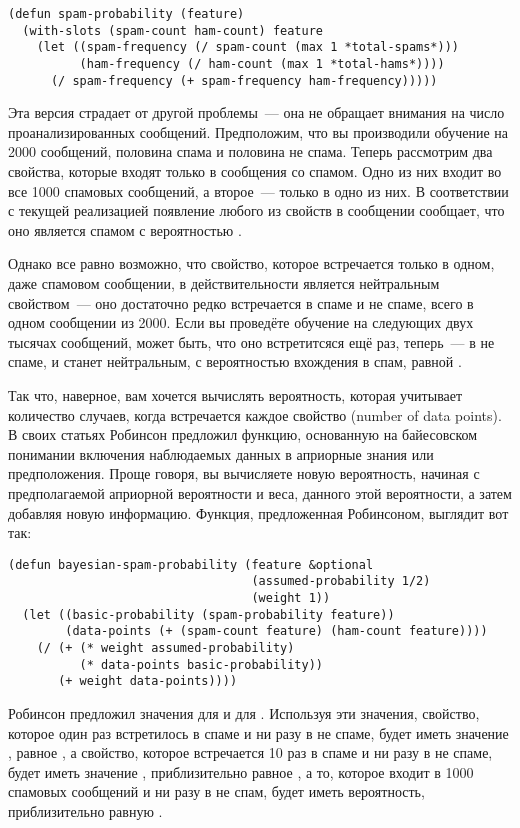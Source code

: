 \begin{lstlisting}
(defun spam-probability (feature)
  (with-slots (spam-count ham-count) feature
    (let ((spam-frequency (/ spam-count (max 1 *total-spams*)))
          (ham-frequency (/ ham-count (max 1 *total-hams*))))
      (/ spam-frequency (+ spam-frequency ham-frequency)))))
\end{lstlisting}

Эта версия страдает от другой проблемы~--- она не обращает внимания на число
проанализированных сообщений.  Предположим, что вы производили обучение на 2000 сообщений,
половина спама и половина не спама.  Теперь рассмотрим два свойства, которые входят только
в сообщения со спамом.  Одно из них входит во все 1000 спамовых сообщений, а второе~---
только в одно из них.  В соответствии с текущей реализацией 
появление любого из свойств в сообщении сообщает, что оно является спамом с вероятностью
.

Однако все равно возможно, что свойство, которое встречается только в одном, даже
спамовом сообщении, в действительности является нейтральным свойством~--- оно достаточно
редко встречается в спаме и не спаме, всего в одном сообщении из 2000.  Если вы проведёте
обучение на следующих двух тысячах сообщений, может быть, что оно встретитсяся ещё раз,
теперь~--- в не спаме, и станет нейтральным, с вероятностью вхождения в спам, равной
.

Так что, наверное, вам хочется вычислять вероятность, которая учитывает количество
случаев, когда встречается каждое свойство (number of data points).  В своих статьях
Робинсон предложил функцию, основанную на байесовском понимании включения наблюдаемых
данных в априорные знания или предположения. Проще говоря, вы вычисляете новую вероятность,
начиная с предполагаемой априорной вероятности и веса, данного этой вероятности, а затем
добавляя новую информацию. Функция, предложенная Робинсоном, выглядит вот так:

\begin{lstlisting}
(defun bayesian-spam-probability (feature &optional
                                  (assumed-probability 1/2)
                                  (weight 1))
  (let ((basic-probability (spam-probability feature))
        (data-points (+ (spam-count feature) (ham-count feature))))
    (/ (+ (* weight assumed-probability)
          (* data-points basic-probability))
       (+ weight data-points))))
\end{lstlisting}

Робинсон предложил значения  для  и  для
.  Используя эти значения, свойство, которое один раз встретилось в спаме и
ни разу в не спаме, будет иметь значение , равное
, а свойство, которое встречается 10 раз в спаме и ни разу в не спаме, будет
иметь значение , приблизительно равное , а то,
которое входит в 1000 спамовых сообщений и ни разу в не спам, будет иметь вероятность,
приблизительно равную .

